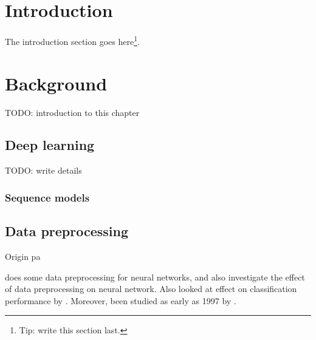\documentclass{statsmsc}
\begin{document}
\chapter{Introduction} %

The introduction section goes here\footnote{Tip: write this section last.}.


\chapter{Background} %

TODO: introduction to this chapter

\section{Deep learning}%
\label{sec:Deep learning}

TODO: write details


\subsection{Sequence models}%
\label{sub:Sequence models}



\section{Data preprocessing}%
\label{sec:Data preprocessing}

Origin pa

\cite{stanislav} does some data preprocessing for neural networks, and
\cite{nawi} also investigate the effect of data preprocessing on neural network.
Also looked at effect on classification performance by \cite{singh}.
Moreover, been studied as early as 1997 by \citep{preprocess_origin}.
\end{document}
